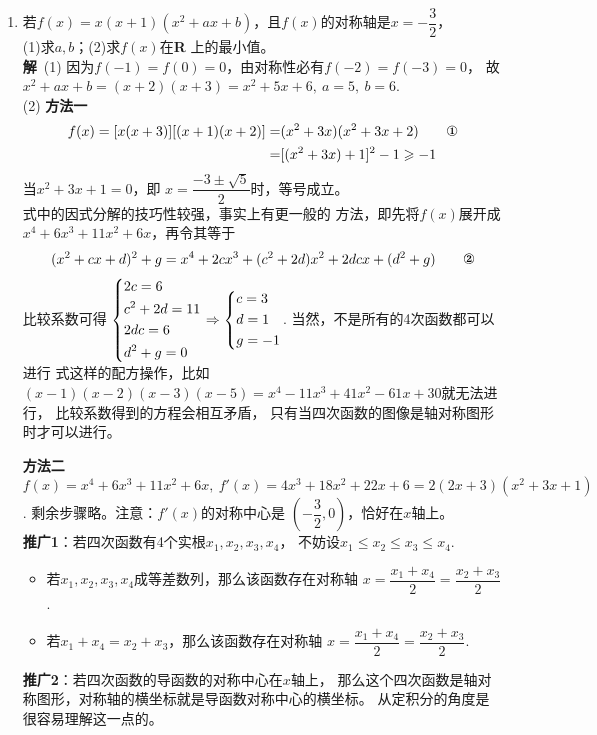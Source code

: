 \begin{enumerate}[label={【\textbf{例\thechapter.\arabic*}】},
 leftmargin=\inteval{\myenumleftmargin}pt,
 itemsep=\inteval{\myenumitempsep}pt,
 itemindent=\inteval{\myenumitemindent}pt]
\item \label{四次函数的轴对称性}
若$ f(x)=x(x+1)(x^2+ax+b) $，且$ f(x) $的对称轴是$ x=
-\dfrac{3}{2} $，\\ (1)求$ a,b $；\quad (2)求$ f(x) $在\textbf{R}
上的最小值。\\
\textbf{解}\ (1) 因为$ f(-1)=f(0)=0 $，由对称性必有$ f(-2)=f(-3)=0 $，
故$ x^2+ax+b=(x+2)(x+3)=x^2+5x+6,\ a=5,\ b=6 $. \\
(2) \textbf{方法一}
\begin{align*}
    f(x)=[x(x+3)][(x+1)(x+2)]=&(x^2+3x)(x^2+3x+2) \tag*{\ding{172}}\\
    =&[(x^2+3x)+1]^2-1 \geq -1 
\end{align*}
当$ x^2+3x+1=0 $，即 $ x=\dfrac{-3\pm\sqrt{5}}{2} $时，等号成立。\\
式中的因式分解的技巧性较强，事实上有更一般的
方法，即先将$ f(x) $展开成$ x^4 + 6x^3 + 11x^2 + 6x $，再令其等于
\begin{gather}
    (x^2+cx+d)^2+g=x^4+2cx^3+(c^2+2d)x^2+2dcx+(d^2+g)
     \tag*{\ding{173}}
\end{gather}
比较系数可得
$ \begin{dcases}
    2c=6 \\
    c^2+2d=11 \\
    2dc=6 \\
    d^2+g=0
\end{dcases} \Rightarrow 
\begin{dcases}
    c=3 \\
    d=1\\
    g=-1
\end{dcases} $. 当然，不是所有的4次函数都可以进行
式这样的配方操作，比如
$ (x-1)(x-2)(x-3)(x-5)=x^4-11x^3+41x^2-61x+30 $就无法进行，
比较系数得到的方程会相互矛盾，
只有当四次函数的图像是轴对称图形时才可以进行。

\textbf{方法二}\ $ f(x)=x^4 + 6x^3 + 11x^2 + 6x,\ f'(x)=4x^3+18x^2+22x+6=
2(2x + 3)(x^2 + 3x + 1) $. 剩余步骤略。注意：$ f'(x) $的对称中心是
$ \left(-\dfrac{3}{2},0\right ) $，恰好在$ x $轴上。\\
\textbf{推广1}：若四次函数有4个实根$ x_1,x_2,x_3,x_4 $，
不妨设$ x_1\leq x_2\leq x_3\leq x_4 $. 
\begin{itemize}[itemsep=-1pt]
    \item 若$ x_1,x_2,x_3,x_4 $成等差数列，那么该函数存在对称轴
    $ x=\dfrac{x_1+x_4}{2}=\dfrac{x_2+x_3}{2} $. 
    \item 若$ x_1+x_4=x_2+x_3 $，那么该函数存在对称轴
    $ x=\dfrac{x_1+x_4}{2}=\dfrac{x_2+x_3}{2} $.
\end{itemize}
\textbf{推广2}：若四次函数的导函数的对称中心在$ x $轴上，
那么这个四次函数是轴对称图形，对称轴的横坐标就是导函数对称中心的横坐标。
从定积分的角度是很容易理解这一点的。


\end{enumerate}
